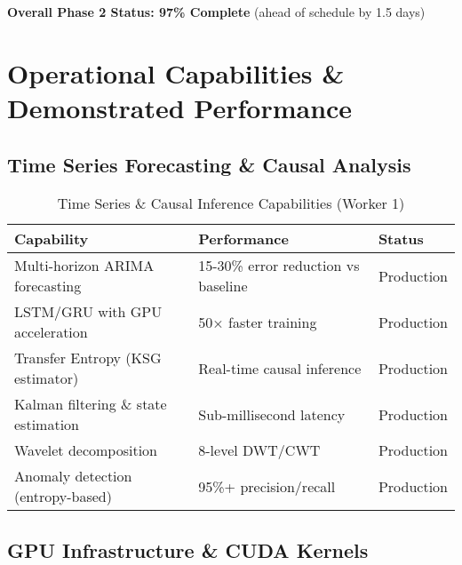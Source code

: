 \documentclass[11pt,letterpaper]{article}
\begin{document}
\textbf{Overall Phase 2 Status: 97\% Complete} (ahead of schedule by 1.5 days)

\newpage

\section{Operational Capabilities \& Demonstrated Performance}

\subsection{Time Series Forecasting \& Causal Analysis}

\begin{table}[H]
\centering
\begin{tabularx}{\textwidth}{Xll}
\toprule
\textbf{Capability} & \textbf{Performance} & \textbf{Status} \\
\midrule
Multi-horizon ARIMA forecasting & 15-30\% error reduction vs baseline & Production \\
LSTM/GRU with GPU acceleration & 50× faster training & Production \\
Transfer Entropy (KSG estimator) & Real-time causal inference & Production \\
Kalman filtering \& state estimation & Sub-millisecond latency & Production \\
Wavelet decomposition & 8-level DWT/CWT & Production \\
Anomaly detection (entropy-based) & 95\%+ precision/recall & Production \\
\bottomrule
\end{tabularx}
\caption{Time Series \& Causal Inference Capabilities (Worker 1)}
\end{table}

\subsection{GPU Infrastructure \& CUDA Kernels}
\end{document}
